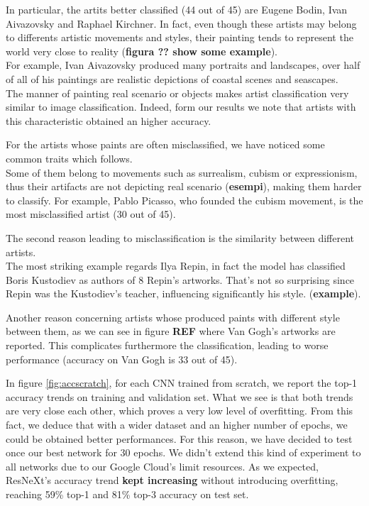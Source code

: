 \documentclass{article}
\begin{document}
In particular, the artits better classified (44 out of 45) are Eugene Bodin, Ivan Aivazovsky and Raphael Kirchner. In fact, even though these artists may belong to differents artistic movements and styles, their painting tends to represent the world very close to reality (\textbf{figura ?? show some example}).\\
For example, Ivan Aivazovsky produced many portraits and landscapes, over half of all of his paintings are realistic depictions of coastal scenes and seascapes. \\
The manner of painting real scenario or objects makes artist classification very similar to image classification. Indeed, form our results we note that artists with this characteristic obtained an higher accuracy.

For the artists whose paints are often misclassified, we have noticed some common traits which follows.\\
Some of them belong to movements such as surrealism, cubism or expressionism, thus their artifacts are not depicting real scenario (\textbf{esempi}), making them harder to classify.
For example, Pablo Picasso, who founded the cubism movement, is the most misclassified artist (30 out of 45).
  
The second reason leading to misclassification is the similarity  between different artists.\\
The most striking example regards Ilya Repin, in fact the model has classified Boris Kustodiev as authors of 8 Repin's artworks. That's not so surprising since Repin was the Kustodiev's teacher, influencing significantly his style. (\textbf{example}).

Another reason concerning artists whose produced paints with different style between them, as we can see in figure \textbf{REF} where Van Gogh's artworks are reported. This complicates furthermore the classification, leading to worse performance (accuracy on Van Gogh is 33 out of 45).

In figure \ref{fig:accscratch}, for each CNN trained from scratch,  we report the top-1 accuracy trends on training and validation set. What we see is that both trends are very close each other, which proves a very low level of overfitting.
From this fact, we deduce that with a wider dataset and an higher number of epochs, we could be obtained better performances. For this reason, we have decided to test once our best network for 30 epochs. We didn't extend this kind of experiment to all networks due to our Google Cloud's limit resources. As we expected, ResNeXt's accuracy trend \textbf{kept increasing } without introducing overfitting, reaching 59\% top-1 and 81\% top-3 accuracy on test set.
\end{document}
